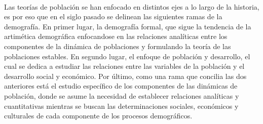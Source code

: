\documentclass[11pt,spanish,letterpaper]{article}
\theoremstyle{plain}
\begin{document}
\\
Las teor\'ias de poblaci\'on se han enfocado en distintos ejes a lo largo de la historia, es por eso que en el siglo pasado se delinean las siguientes ramas de la demograf\'ia. En primer lugar, la demograf\'ia formal, que sigue la tendencia de la artim\'etica demogr\'afica enfocandose en las relaciones anal\'iticas entre los componentes de la din\'amica de poblaciones y formulando la teor\'ia de las poblaciones estables. En segundo lugar, el enfoque de poblaci\'on y desarrollo, el cual se dedica a estudiar las relaciones entre las variables de la poblaci\'on y el desarrollo social y econ\'omico. Por \'ultimo, como una rama que concilia las dos anteriores est\'a el estudio espec\'ifico de los componentes de las din\'amicas de poblaci\'on, donde se asume la necesidad de establecer relaciones anal\'iticas y cuantitativas mientras se buscan las determinaciones sociales, econ\'omicos y culturales de cada componente de los procesos demogr\'aficos.\\


\end{document}
